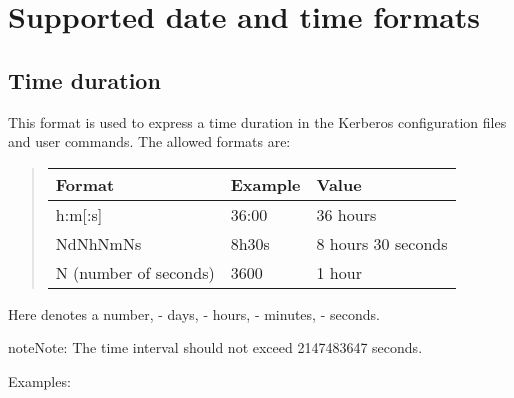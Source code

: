 \documentclass[letterpaper,10pt,english]{sphinxmanual}
\begin{document}
\chapter{Supported date and time formats}
\label{\detokenize{basic/date_format:supported-date-and-time-formats}}\label{\detokenize{basic/date_format::doc}}\label{\detokenize{basic/date_format:datetime}}

\section{Time duration}
\label{\detokenize{basic/date_format:duration}}\label{\detokenize{basic/date_format:time-duration}}
This format is used to express a time duration in the Kerberos
configuration files and user commands.  The allowed formats are:
\begin{quote}


\begin{savenotes}\sphinxattablestart
\centering
\begin{tabulary}{\linewidth}[t]{|T|T|T|}
\hline

Format
&
Example
&
Value
\\
\hline
h:m{[}:s{]}
&
36:00
&
36 hours
\\
\hline
NdNhNmNs
&
8h30s
&
8 hours 30 seconds
\\
\hline
N (number of seconds)
&
3600
&
1 hour
\\
\hline
\end{tabulary}
\par
\sphinxattableend\end{savenotes}
\end{quote}

Here  denotes a number,  - days,  - hours,  - minutes,
 - seconds.

\begin{sphinxadmonition}{note}{Note:}
The time interval should not exceed 2147483647 seconds.
\end{sphinxadmonition}

Examples:

%
\begin{sphinxVerbatim}[commandchars=\\\{\}]
          
   

    
    
    
    
\end{sphinxVerbatim}
\end{document}
